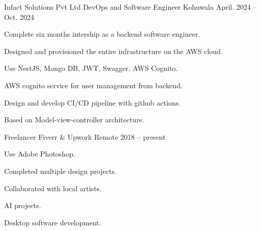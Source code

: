 

\begin{cventries}

  \cventry
    {Infact Solutions Pvt Ltd} %
    {DevOps and Software Engineer} %
    {Kohuwala} %
    {April. 2024 -- Oct. 2024} %
    {
      \begin{cvitems} %
        \item {Complete six months intership as a backend software engineer.}
        \item {Designed and provisioned the entire infrastructure on the AWS cloud.}
        \item {Use NestJS, Mongo DB, JWT, Swagger, AWS Cognito.}
        \item {AWS cognito service for user management from backend.}
        \item {Design and develop CI/CD pipeline with github actions.}
        \item {Based on Model-view-controller architecture.}
      \end{cvitems}
    }

  \cventry
    {Freelancer} %
    {Fiverr \& Upwork} %
    {Remote} %
    {2018 -- present} %
    {
      \begin{cvitems} %
        \item {Use Adobe Photoshop.}
        \item {Completed multiple design projects.}
        \item {Collaborated with local artists.}
        \item {AI projects.}
        \item {Desktop software development.}
      \end{cvitems}
    }


\end{cventries}

